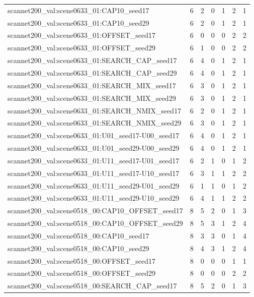 \begin{table}[t]
\begin{tabular}{lrrrrrr}
scannet200\_val:scene0633\_01:CAP10\_seed17 & 6 & 2 & 0 & 1 & 2 & 1 \\
scannet200\_val:scene0633\_01:CAP10\_seed29 & 6 & 2 & 0 & 1 & 2 & 1 \\
scannet200\_val:scene0633\_01:OFFSET\_seed17 & 6 & 0 & 0 & 0 & 2 & 2 \\
scannet200\_val:scene0633\_01:OFFSET\_seed29 & 6 & 1 & 0 & 0 & 2 & 2 \\
scannet200\_val:scene0633\_01:SEARCH\_CAP\_seed17 & 6 & 4 & 0 & 1 & 2 & 1 \\
scannet200\_val:scene0633\_01:SEARCH\_CAP\_seed29 & 6 & 4 & 0 & 1 & 2 & 1 \\
scannet200\_val:scene0633\_01:SEARCH\_MIX\_seed17 & 6 & 3 & 0 & 1 & 2 & 1 \\
scannet200\_val:scene0633\_01:SEARCH\_MIX\_seed29 & 6 & 3 & 0 & 1 & 2 & 1 \\
scannet200\_val:scene0633\_01:SEARCH\_NMIX\_seed17 & 6 & 2 & 0 & 1 & 2 & 1 \\
scannet200\_val:scene0633\_01:SEARCH\_NMIX\_seed29 & 6 & 3 & 0 & 1 & 2 & 1 \\
scannet200\_val:scene0633\_01:U01\_seed17-U00\_seed17 & 6 & 4 & 0 & 1 & 2 & 1 \\
scannet200\_val:scene0633\_01:U01\_seed29-U00\_seed29 & 6 & 4 & 0 & 1 & 2 & 1 \\
scannet200\_val:scene0633\_01:U11\_seed17-U01\_seed17 & 6 & 2 & 1 & 0 & 1 & 2 \\
scannet200\_val:scene0633\_01:U11\_seed17-U10\_seed17 & 6 & 3 & 1 & 1 & 2 & 2 \\
scannet200\_val:scene0633\_01:U11\_seed29-U01\_seed29 & 6 & 1 & 1 & 0 & 1 & 2 \\
scannet200\_val:scene0633\_01:U11\_seed29-U10\_seed29 & 6 & 4 & 1 & 1 & 2 & 2 \\
scannet200\_val:scene0518\_00:CAP10\_OFFSET\_seed17 & 8 & 5 & 2 & 0 & 1 & 3 \\
scannet200\_val:scene0518\_00:CAP10\_OFFSET\_seed29 & 8 & 5 & 3 & 1 & 2 & 4 \\
scannet200\_val:scene0518\_00:CAP10\_seed17 & 8 & 3 & 3 & 0 & 1 & 4 \\
scannet200\_val:scene0518\_00:CAP10\_seed29 & 8 & 4 & 3 & 1 & 2 & 4 \\
scannet200\_val:scene0518\_00:OFFSET\_seed17 & 8 & 0 & 0 & 0 & 1 & 1 \\
scannet200\_val:scene0518\_00:OFFSET\_seed29 & 8 & 0 & 0 & 0 & 2 & 2 \\
scannet200\_val:scene0518\_00:SEARCH\_CAP\_seed17 & 8 & 5 & 2 & 0 & 1 & 3 \\

\end{tabular}
\end{table}
